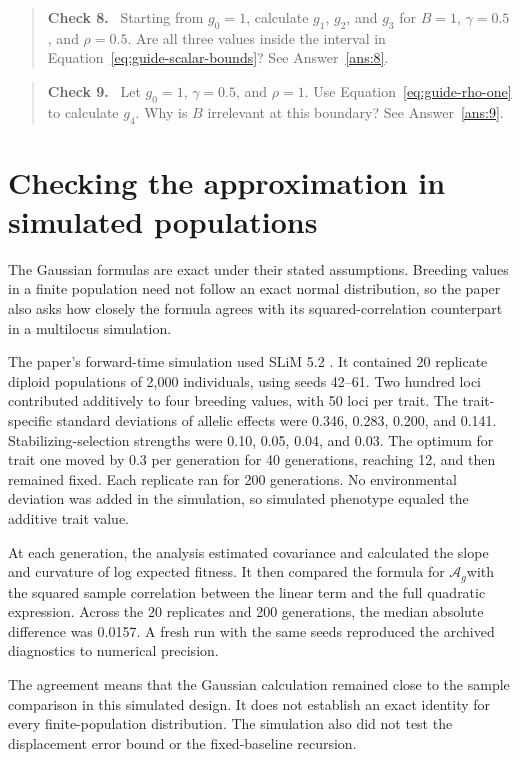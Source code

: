 \documentclass[11pt]{article}
\newcommand{\Ag}{\ensuremath{\mathcal A_g}}
\newenvironment{checkpoint}[1]
  {\begin{quote}\small\noindent\textbf{Check #1.}\ }
  {\end{quote}}
\begin{document}
\begin{checkpoint}{8}
Starting from $g_0=1$, calculate $g_1$, $g_2$, and $g_3$ for $B=1$,
$\gamma=0.5$, and $\rho=0.5$.  Are all three values inside the interval in
Equation~\eqref{eq:guide-scalar-bounds}?  See Answer~\ref{ans:8}.
\end{checkpoint}

\begin{checkpoint}{9}
Let $g_0=1$, $\gamma=0.5$, and $\rho=1$.  Use
Equation~\eqref{eq:guide-rho-one} to calculate $g_4$.  Why is $B$ irrelevant
at this boundary?  See Answer~\ref{ans:9}.
\end{checkpoint}

\section{Checking the approximation in simulated populations}
\label{sec:s4}

The Gaussian formulas are exact under their stated assumptions. Breeding values in a finite population need not follow an exact normal distribution, so the paper also asks how closely the formula agrees with its squared-correlation counterpart in a multilocus simulation.

The paper's forward-time simulation used SLiM 5.2 \citep{HallerEtAl2026}.  It
contained 20 replicate diploid populations of 2,000 individuals, using seeds
42--61.  Two hundred loci contributed additively to four breeding values, with
50 loci per trait.  The trait-specific standard deviations of allelic effects
were 0.346, 0.283, 0.200, and 0.141.  Stabilizing-selection strengths were
0.10, 0.05, 0.04, and 0.03.  The optimum for trait one moved by 0.3 per
generation for 40 generations, reaching 12, and then remained fixed.  Each
replicate ran for 200 generations.  No environmental deviation was added in
the simulation, so simulated phenotype equaled the additive trait value.

At each generation, the analysis estimated covariance and calculated the slope and curvature of log expected fitness. It then compared the formula for \Ag with the squared sample correlation between the linear term and the full quadratic expression. Across the 20 replicates and 200 generations, the median absolute difference was 0.0157. A fresh run with the same seeds reproduced the archived diagnostics to numerical precision.

The agreement means that the Gaussian calculation remained close to the sample comparison in this simulated design. It does not establish an exact identity for every finite-population distribution. The simulation also did not test the displacement error bound or the fixed-baseline recursion.
\end{document}
